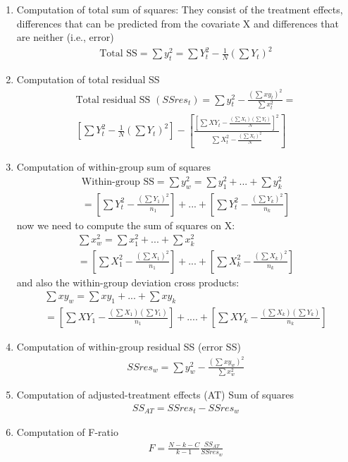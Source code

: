 \documentclass{article}
\begin{document}
\begin{enumerate}
  \item Computation of total sum of squares: They consist of the treatment effects, differences that can be predicted from the covariate X and differences that are neither (i.e., error) 
  \begin{align}
    \text{Total SS} = \sum{y_t^2} = \sum{Y_t^2} - \frac{1}{N}(\sum{Y_t})^2
  \end{align}
  
  \item Computation of total residual SS 
  \begin{eqnarray*}
  \text{Total residual SS }(SSres_t) = \sum{y_t^2} - \frac{(\sum{xy_t})^2}{\sum{x_t^2}} = \\
  \left[\sum{Y_t^2} - \frac{1}{N}(\sum{Y_t})^2 \right] -
  \left[\frac{\left[\sum{XY_t} -
  \frac{(\sum{X_t})(\sum{Y_t})}{N}\right]^2}{\sum{X_t^2} - \frac{(\sum{X_t})^2}{N}} \right]
  \end{eqnarray*}

  \item Computation of within-group sum of squares 
    \begin{eqnarray*}
    \text{Within-group SS} = \sum{y_w^2} = \sum{y_1^2} + ... + \sum{y_k^2} \\
    = \left[\sum{Y_t^2} - \frac{(\sum{Y_1})^2}{n_1}\right] + ... + \left[\sum{Y_t^2} - \frac{(\sum{Y_k})^2}{n_k}\right] 
    \end{eqnarray*}
  now we need to compute the sum of squares on X: 
  \begin{eqnarray*}
    \sum{x_w^2} = \sum{x_1^2} + ... + \sum{x_k^2} \\
    = \left[ \sum{X_1^2} - 
    \frac{(\sum{X_1})^2}{n_1} \right] + ... + 
    \left[ \sum{X_k^2} - \frac{(\sum{X_k})^2}{n_k} \right]
  \end{eqnarray*}
  and also the within-group deviation cross products: 
  \begin{eqnarray*}
    \sum{xy_w} = \sum{xy_1} + ... + \sum{xy_k} \\
    = \left[ \sum{XY_1} - 
    \frac{(\sum{X_1})(\sum{Y_1})}{n_1}\right] + .... +
    \left[\sum{XY_k} - \frac{(\sum{X_k})(\sum{Y_k})}{n_k}\right]
  \end{eqnarray*}
  
  \item Computation of within-group residual SS (error SS)
  \begin{align*}
  SSres_w = \sum{y_w^2} - \frac{(\sum{xy_w})^2}{\sum{x_w^2}}
  \end{align*}
  
  \item Computation of adjusted-treatment effects (AT) Sum of squares 
  \begin{align*}
  SS_{AT} = SSres_t - SSres_w 
  \end{align*}
  
  \item Computation of F-ratio 
  \begin{align*}
  F = \frac{N-k-C}{k-1}\frac{SS_{AT}}{SSres_w}
  \end{align*}
\end{enumerate}
\end{document}
